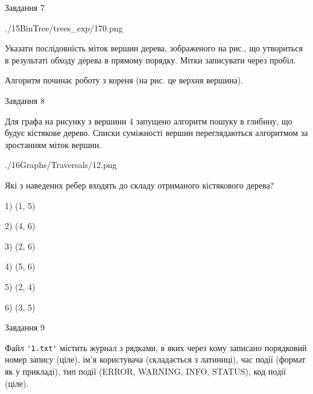 \documentclass[12pt, ukrainian]{article}
\def\code#1{\Verb!#1!}
\begin{document}
{\vspace{10mm}\par

\newpage
\begin{minipage}[t]{9.7cm}
               
{\begin{center}Завдання {7}\end{center}}
\vspace{-6mm}

\begin{center}
	{./15BinTree/trees_exp/170.png}
\end{center}
Указати послідовність міток вершин дерева, зображеного на рис., що утвориться в результаті обходу дерева в прямому порядку. Мітки записувати через пробіл.\par Алгоритм починає роботу з кореня (на рис. це верхня вершина).\par

\end{minipage}
\vline \hspace{8mm}
\begin{minipage}[t]{8.0cm}
               
{\begin{center}Завдання {8}\end{center}}
\vspace{-6mm}
Для графа на рисунку з вершини 4 запущено алгоритм пошуку в глибину, що будує кістякове дерево. Списки суміжності вершин переглядаються алгоритмом за зростанням міток вершин.\par
\begin{center}
	{./16Graphs/Traversals/12.png}
\end{center}
\par Які з наведених ребер входять до складу отриманого кістякового дерева?\par
1) (1, 5)\par
2) (4, 6)\par
3) (2, 6)\par
4) (5, 6)\par
5) (2, 4)\par
6) (3, 5)\par
{\vskip 15pt} \par

\end{minipage}

               
{\begin{center}Завдання {9}\end{center}}
\vspace{-6mm}
Файл \code{'1.txt'} містить журнал з рядками, в яких через кому записано поряд\-ко\-вий номер запису (ціле), ім'я користувача (складається з латиниці), час події (фор\-мат як у прикладі), тип події (ERROR, WARNING, INFO, STATUS), код події (ціле).

}
\end{document}
